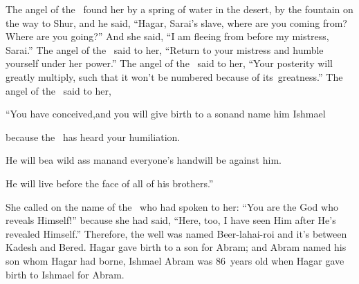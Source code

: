 \begin{inparaenum}
   The angel of the \lord\ found her by a spring of water in the desert, by the fountain on the way to Shur,%
   and he said, ``Hagar, Sarai's slave, where are you coming from? Where are you going?'' And she said, ``I am fleeing from before my mistress, Sarai.''%
   The angel of the \lord\ said to her, ``Return to your mistress and humble yourself under her power.'' %
   The angel of the \lord\ said to her, ``Your posterity will greatly multiply, such that it won't be numbered because of its\understood{}\ greatness.''%
   The angel of the \lord\ said to her,%

  \pc{}``You have conceived,\pa{}and you will give birth to a son\pa{}and name him Ishmael%

  \pc{}because the \lord\ has heard your humiliation.%

  \pb{} He will be\pa{}a wild ass%
  man\pa{}and everyone's hand\pa{}will be against him.%

  \pc{}He will live before the face of all of his brothers.''\smallskip%

  \noindent{} She called on the name of the \lord\ who had spoken to her: ``You are the God who reveals Himself!'' because she had said, ``Here, too, I have seen Him after He's revealed Himself.''%
   Therefore, the well was named Beer-lahai-roi and it's between Kadesh and Bered.%
   Hagar gave birth to a son for Abram; and Abram named his son whom Hagar had borne, Ishmael%
   Abram was 86~years old when Hagar gave birth to Ishmael for Abram.%
\end{inparaenum}
